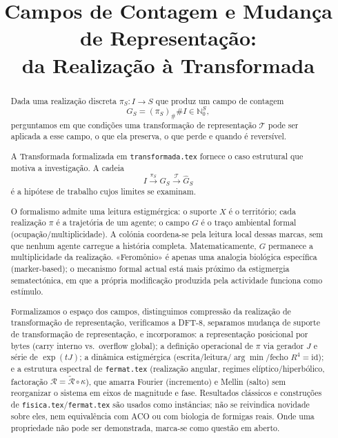 \documentclass[11pt,a4paper]{article}
\title{Campos de Contagem e Mudança de Representação:\\
da Realização à Transformada}
\author{}
\date{}
\begin{document}
\maketitle

\begin{abstract}
\noindent
Dada uma realização discreta \(\pi_S\colon I\to S\) que produz um campo de contagem
\[
G_S=(\pi_S)_{\#}\#I\in\mathbb N_0^S,
\]
perguntamos em que condições uma transformação de representação \(\mathcal T\) pode ser aplicada a esse campo, o que ela preserva, o que perde e quando é reversível.

A Transformada formalizada em \texttt{transformada.tex} fornece o caso estrutural que motiva a investigação. A cadeia
\[
I\xrightarrow{\pi_S}G_S\xrightarrow{\mathcal T}\widehat G_S
\]
é a hipótese de trabalho cujos limites se examinam.

O formalismo admite uma leitura estigmérgica: o suporte \(X\) é o território; cada realização \(\pi\) é a trajetória de um agente; o campo \(G\) é o traço ambiental formal (ocupação/multiplicidade). A colónia coordena-se pela leitura local dessas marcas, sem que nenhum agente carregue a história completa. Matematicamente, \(G\) permanece a multiplicidade da realização. «Feromônio» é apenas uma analogia biológica específica (marker-based); o mecanismo formal actual está mais próximo da estigmergia sematectónica, em que a própria modificação produzida pela actividade funciona como estímulo.

Formalizamos o espaço dos campos, distinguimos compressão da realização de transformação de representação, verificamos a DFT-8, separamos mudança de suporte de transformação de representação, e incorporamos: a representação posicional por bytes (carry interno vs.\ overflow global); a definição operacional de \(\pi\) via gerador \(J\) e série de \(\exp(tJ)\); a dinâmica estigmérgica (escrita/leitura/\(\arg\min\)/fecho \(R^4=\mathrm{id}\)); e a estrutura espectral de \texttt{fermat.tex} (realização angular, regimes elíptico/hiperbólico, factoração \(\mathcal R=\widetilde{\mathcal R}\circ\kappa\)), que amarra Fourier (incremento) e Mellin (salto) sem reorganizar o sistema em eixos de magnitude e fase. Resultados clássicos e construções de \texttt{fisica.tex}/\texttt{fermat.tex} são usados como instâncias; não se reivindica novidade sobre eles, nem equivalência com ACO ou com biologia de formigas reais. Onde uma propriedade não pode ser demonstrada, marca-se como questão em aberto.
\end{abstract}
\end{document}
